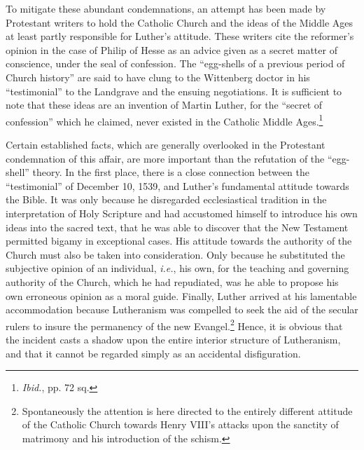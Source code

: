 To mitigate these abundant condemnations, an attempt has been
made by Protestant writers to hold the Catholic Church and the ideas
of the Middle Ages at least partly responsible for Luther’s attitude.
These writers cite the reformer’s opinion in the case of Philip of Hesse
as an advice given as a secret matter of conscience, under the seal of
confession. The “egg-shells of a previous period of Church history”
are said to have clung to the Wittenberg doctor in his “testimonial”
to the Landgrave and the ensuing negotiations. It is sufficient to note
that these ideas are an invention of Martin Luther, for the “secret
of confession” which he claimed, never existed in the Catholic Middle
Ages.\footnote{\textit{Ibid.}, pp. 72 sq.}

Certain established facts, which are generally overlooked in the
Protestant condemnation of this affair, are more important than the
refutation of the “egg-shell” theory. In the first place, there is a close
connection between the “testimonial” of December 10, 1539, and
Luther’s fundamental attitude towards the Bible. It was only because
he disregarded ecclesiastical tradition in the interpretation of Holy
Scripture and had accustomed himself to introduce his own ideas into
the sacred text, that he was able to discover that the New Testament
permitted bigamy in exceptional cases. His attitude towards the authority
of the Church must also be taken into consideration. Only
because he substituted the subjective opinion of an individual, \textit{i.e.},
his own, for the teaching and governing authority of the Church,
which he had repudiated, was he able to propose his own erroneous
opinion as a moral guide. Finally, Luther arrived at his lamentable
accommodation because Lutheranism was compelled to seek the aid
of the secular rulers to insure the permanency of the new Evangel.\footnote
{Spontaneously the attention is here directed to the entirely different attitude of the
Catholic Church towards Henry VIII’s attacks upon the sanctity of matrimony and his
introduction of the schism.}
Hence, it is obvious that the incident casts a shadow upon the entire
interior structure of Lutheranism, and that it cannot be regarded
simply as an accidental disfiguration.
